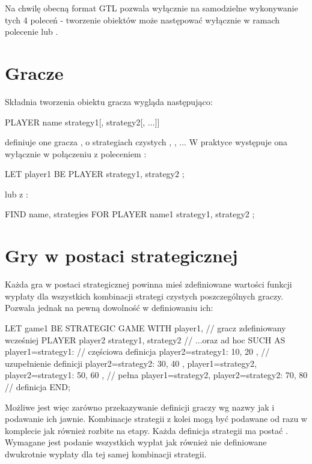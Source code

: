 \documentclass{standalone}
\begin{document}
Na chwilę obecną format GTL pozwala wyłącznie na samodzielne wykonywanie tych 4 poleceń - tworzenie obiektów może następować wyłącznie w ramach
polecenie  lub .

\section{Gracze}

Składnia tworzenia obiektu gracza wygląda następująco:

\begin{code}
PLAYER name { strategy1[, strategy2[, ...]] }
\end{code}

definiuje one gracza , o strategiach czystych , ,
... W praktyce występuje ona wyłącznie w połączeniu z poleceniem :

\begin{code}
LET player1 BE PLAYER { strategy1, strategy2 };
\end{code}

lub z :

\begin{code}
FIND name, strategies FOR PLAYER name1 { strategy1, strategy2 };
\end{code}

\section{Gry w postaci strategicznej}

Każda gra w postaci strategicznej powinna mieś zdefiniowane wartości funkcji wypłaty dla wszystkich kombinacji strategi czystych poszczególnych
graczy. Pozwala jednak na pewną dowolność w definiowaniu ich:

\begin{code}
LET game1 BE
  STRATEGIC GAME
  WITH
    player1, // gracz zdefiniowany wcześniej
  	PLAYER player2 { strategy1, strategy2 } // ...oraz ad hoc
  SUCH AS
    { player1=strategy1: // częściowa definicja
  	  { player2=strategy1: 10, 20 }, // uzupełnienie definicji
  	  { player2=strategy2: 30, 40 }
    },
    { player1=strategy2, player2=strategy1: 50, 60 }, // pełna
    { player1=strategy2, player2=strategy2: 70, 80 }  // definicja
  END;
\end{code}

Możliwe jest więc zarówno przekazywanie definicji graczy wg nazwy jak i podawanie ich jawnie. Kombinacje strategii z kolei mogą być podawane
od razu w komplecie jak również rozbite na etapy. Każda definicja strategii ma postać . Wymagane jest podanie wszystkich wypłat jak również nie definiowane dwukrotnie wypłaty dla tej samej kombinacji strategii.
\end{document}
